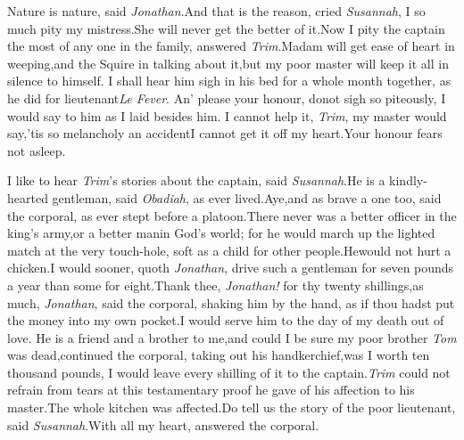 \documentclass{article}
\begin{document}
\enlargethispage\baselineskip
\tsh  Nature is nature, said \textit{Jonathan}.\tsk And that is the reason, cried
\textit{Susannah}, I so much pity my mistress.\tsk She will never get the better of
it.\tsk Now I pity the captain the most of any one in the family, answered
\textit{Trim}.\tsh Madam will get ease of heart in weeping,\tsk and the Squire in
talking about it,\tsk but my poor master will keep it all in silence to himself.\tsk
I shall hear him sigh in his bed for a whole month together, as he did for
lieutenant\break \textit{Le Fever}. An’ please your honour,
do\break not sigh so piteously, I
would say to him as I laid besides him. I cannot help it, \textit{Trim}, my
master would say,\tsk ’tis so melancholy an accident\tsk I cannot get it off my
heart.\tsk Your honour fears not 
 asleep.

I like to hear \textit{Trim}’s stories about the captain, said
\textit{Susannah}.\tsk He is a kindly-hearted gentleman, said \textit{Obadiah}, as
ever lived.\tsk Aye,\tsk and as brave a one too, said the corporal, as ever stept before
a platoon.\tsk There never was a better offi\-cer in the king’s army,\tsk or a better
man\break in God’s world; for he would march up 
the lighted match at the very touch-hole,\break{} soft as a child for other people.\tsh He\break would not hurt a chicken.\tsh I would
sooner, quoth \textit{Jonathan}, drive such a gentleman for seven pounds a year\tsk
than some for eight.\tsk Thank thee, \textit{Jonathan!} for thy twenty
shillings,\tsk as much, \textit{Jo\-nathan}, said the corporal, shaking him by the
hand, as if thou hadst put the money into my own pocket.\tsh I would serve him to
the day of my death out of love. He is a friend and a brother to me,\tsk and could I
be sure my poor brother \textit{Tom} was dead,\tsk continued the corporal, taking
out his handkerchief,\tsk was I worth ten thousand pounds, I would leave every
shilling of it to the captain.\tsh \textit{Trim} could not refrain from tears at
this testamentary proof he gave of his affection to his master.\tsh The whole
kitchen was affected.\tsh Do tell us the story of the poor lieutenant, said
\textit{Susannah}.\tsh With all my heart, answered the corporal.
\end{document}
